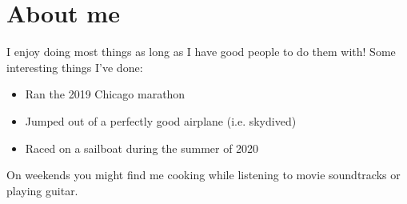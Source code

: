 \documentclass[a4paper,10pt]{article}
\begin{document}
\section{About me}
I enjoy doing most things as long as I have good people to do them with! Some interesting things I've done:
\begin{itemize}
  \item Ran the 2019 Chicago marathon
  \item Jumped out of a perfectly good airplane (i.e. skydived)
  \item Raced on a sailboat during the summer of 2020
\end{itemize}

On weekends you might find me cooking while listening to movie soundtracks or playing guitar.
\end{document}
